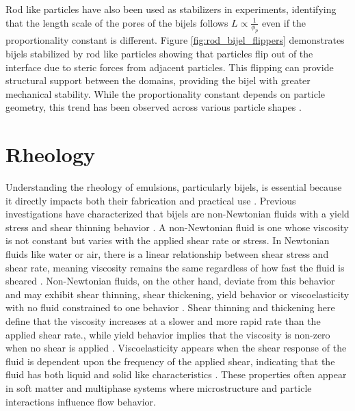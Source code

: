 Rod like particles have also been used as stabilizers in experiments, identifying that the length scale of the pores of the bijels follows $ L \propto \frac{1}{\phi_p} $ even if the 
proportionality constant is different. Figure \ref{fig:rod_bijel_flippers} demonstrates bijels stabilized by rod like particles showing that particles flip out of the interface due to steric 
forces from adjacent particles. This flipping can provide structural support between the domains, providing the bijel with greater mechanical stability.
While the proportionality constant depends on particle geometry, this trend has been observed across various particle shapes 
\cite{hijnen_bijels_2015, madivala_exploiting_2009, gunther_timescales_2014, daware_emulsions_2015, loudet_capillary_2005, cheng_shape-anisotropic_2013}. 

\section{Rheology}

Understanding the rheology of emulsions, particularly bijels, is essential because it directly impacts both their fabrication and practical use \cite{haase_situ_2016}.
Previous investigations have characterized that bijels are non-Newtonian fluids with a yield stress and shear thinning behavior \cite{macmillan_rheological_2019}.
A non-Newtonian fluid is one whose viscosity is not constant but varies with the applied shear rate or stress. In Newtonian fluids like water 
or air, there is a linear relationship between shear stress and shear rate, meaning viscosity remains the same regardless of how fast the fluid is sheared \cite{mezger_rheology_2020}. 
Non-Newtonian fluids, on the other hand, deviate from this behavior and may exhibit shear thinning, shear thickening, yield behavior or viscoelasticity with no fluid constrained to one behavior
\cite{mezger_rheology_2020}. Shear thinning and thickening here define that the viscosity increases at a slower and more rapid rate than the applied shear rate., while yield behavior implies that 
the viscosity is non-zero when no shear is applied \cite{mezger_rheology_2020}. Viscoelasticity appears when the shear response of the fluid is dependent upon the frequency of the applied shear, 
indicating that the fluid has both liquid and solid like characteristics \cite{mezger_rheology_2020}. These properties often appear in soft matter and multiphase systems where microstructure and 
particle interactions influence flow behavior.

